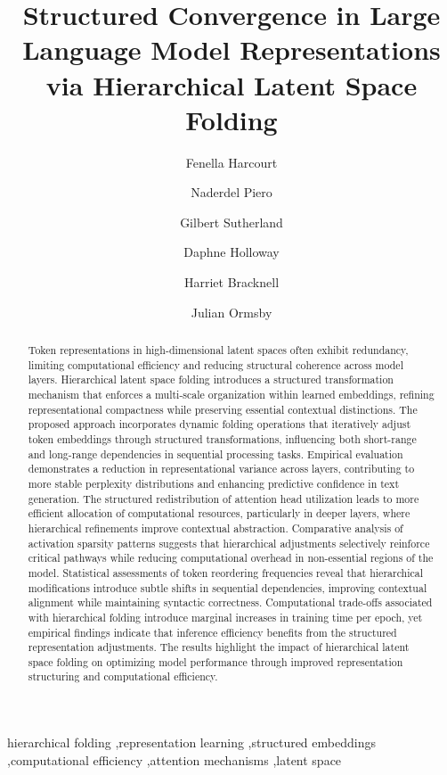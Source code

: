 \documentclass[5p,times]{elsarticle}
\begin{document}
	


\begin{frontmatter}



\title{Structured Convergence in Large Language Model Representations via Hierarchical Latent Space Folding}



\author{Fenella Harcourt}
\author{Naderdel Piero}
\author{Gilbert Sutherland}
\author{Daphne Holloway}
\author{Harriet Bracknell}
\author{Julian Ormsby}











\begin{abstract}
Token representations in high-dimensional latent spaces often exhibit redundancy, limiting computational efficiency and reducing structural coherence across model layers. Hierarchical latent space folding introduces a structured transformation mechanism that enforces a multi-scale organization within learned embeddings, refining representational compactness while preserving essential contextual distinctions. The proposed approach incorporates dynamic folding operations that iteratively adjust token embeddings through structured transformations, influencing both short-range and long-range dependencies in sequential processing tasks. Empirical evaluation demonstrates a reduction in representational variance across layers, contributing to more stable perplexity distributions and enhancing predictive confidence in text generation. The structured redistribution of attention head utilization leads to more efficient allocation of computational resources, particularly in deeper layers, where hierarchical refinements improve contextual abstraction. Comparative analysis of activation sparsity patterns suggests that hierarchical adjustments selectively reinforce critical pathways while reducing computational overhead in non-essential regions of the model. Statistical assessments of token reordering frequencies reveal that hierarchical modifications introduce subtle shifts in sequential dependencies, improving contextual alignment while maintaining syntactic correctness. Computational trade-offs associated with hierarchical folding introduce marginal increases in training time per epoch, yet empirical findings indicate that inference efficiency benefits from the structured representation adjustments. The results highlight the impact of hierarchical latent space folding on optimizing model performance through improved representation structuring and computational efficiency.

	
\end{abstract}



\begin{keyword}

hierarchical folding \sep representation learning \sep structured embeddings \sep computational efficiency \sep attention mechanisms \sep latent space  
 
\end{keyword}

\end{frontmatter}
\end{document}

